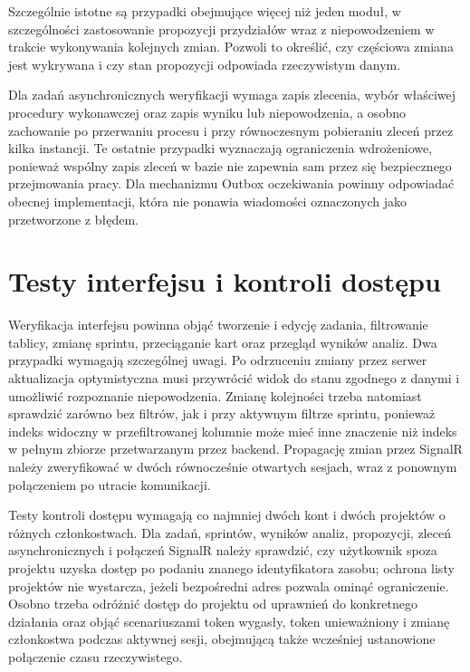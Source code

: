 Szczególnie istotne są przypadki obejmujące więcej niż jeden moduł, w szczególności zastosowanie propozycji przydziałów wraz z niepowodzeniem w trakcie wykonywania kolejnych zmian. Pozwoli to określić, czy częściowa zmiana jest wykrywana i czy stan propozycji odpowiada rzeczywistym danym.

Dla zadań asynchronicznych weryfikacji wymaga zapis zlecenia, wybór właściwej procedury wykonawczej oraz zapis wyniku lub niepowodzenia, a osobno zachowanie po przerwaniu procesu i przy równoczesnym pobieraniu zleceń przez kilka instancji. Te ostatnie przypadki wyznaczają ograniczenia wdrożeniowe, ponieważ wspólny zapis zleceń w bazie nie zapewnia sam przez się bezpiecznego przejmowania pracy. Dla mechanizmu Outbox oczekiwania powinny odpowiadać obecnej implementacji, która nie ponawia wiadomości oznaczonych jako przetworzone z błędem.

\section{Testy interfejsu i kontroli dostępu}

Weryfikacja interfejsu powinna objąć tworzenie i edycję zadania, filtrowanie tablicy, zmianę sprintu, przeciąganie kart oraz przegląd wyników analiz. Dwa przypadki wymagają szczególnej uwagi. Po odrzuceniu zmiany przez serwer aktualizacja optymistyczna musi przywrócić widok do stanu zgodnego z danymi i umożliwić rozpoznanie niepowodzenia. Zmianę kolejności trzeba natomiast sprawdzić zarówno bez filtrów, jak i przy aktywnym filtrze sprintu, ponieważ indeks widoczny w przefiltrowanej kolumnie może mieć inne znaczenie niż indeks w pełnym zbiorze przetwarzanym przez backend. Propagację zmian przez SignalR należy zweryfikować w dwóch równocześnie otwartych sesjach, wraz z ponownym połączeniem po utracie komunikacji.

Testy kontroli dostępu wymagają co najmniej dwóch kont i dwóch projektów o różnych członkostwach. Dla zadań, sprintów, wyników analiz, propozycji, zleceń asynchronicznych i połączeń SignalR należy sprawdzić, czy użytkownik spoza projektu uzyska dostęp po podaniu znanego identyfikatora zasobu; ochrona listy projektów nie wystarcza, jeżeli bezpośredni adres pozwala ominąć ograniczenie. Osobno trzeba odróżnić dostęp do projektu od uprawnień do konkretnego działania oraz objąć scenariuszami token wygasły, token unieważniony i zmianę członkostwa podczas aktywnej sesji, obejmującą także wcześniej ustanowione połączenie czasu rzeczywistego.

